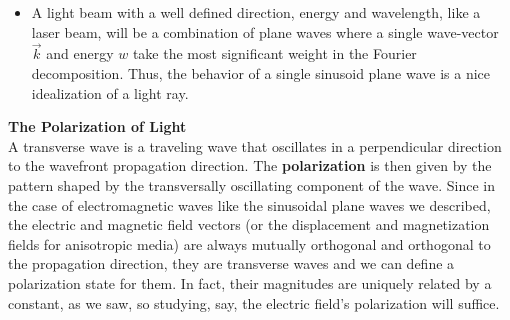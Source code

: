 \documentclass[11pt, a4paper, twoside]{article} %
\DeclareRobustCommand{\mybox}[2][gray!10]{%
\begin{tcolorbox}[   %
        left=0.2cm,
        right=0.2cm,
        top=0.15cm,
        bottom=0.15cm,
        colback=#1,
        colframe=#1,
        width=\dimexpr\textwidth\relax, 
        enlarge left by=0mm,
        boxsep=5pt,
        arc=0pt,outer arc=0pt,
        ]
        #2
\end{tcolorbox}
}
\begin{document}
\begin{itemize}
\item A light beam with a well defined direction, energy and wavelength, like a laser beam, will be a combination of plane waves where a single wave-vector $\vec{k}$ and energy $w$ take the most significant weight in the Fourier decomposition. Thus, the behavior of a single sinusoid plane wave is a nice idealization of a light ray.

\end{itemize}

\mybox{{\bf The Polarization of Light \vspace{0.2cm}}\\
A transverse wave is a traveling wave that oscillates in a perpendicular direction to the wavefront propagation direction. The {\bf polarization} is then given by the pattern shaped by the transversally oscillating component of the wave. Since in the case of electromagnetic waves like the sinusoidal plane waves we described, the electric and magnetic field vectors (or the displacement and magnetization fields for anisotropic media) are always mutually orthogonal and orthogonal to the propagation direction, they are transverse waves and we can define a polarization state for them. In fact, their magnitudes are uniquely related by a constant, as we saw, so studying, say, the electric field's polarization will suffice. \\

}
\end{document}
